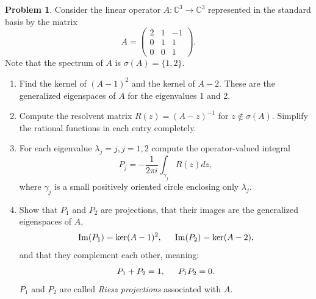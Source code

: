 \documentclass[12pt]{article}
\theoremstyle{definition}
\newtheorem{ex}{Problem}
\begin{document}
\begin{ex}
	Consider the linear operator $A : \mathbb{C}^3 \to \mathbb{C}^3$ represented in the standard basis by the matrix \begin{equation*}
		A = \begin{pmatrix}2 & 1 & -1 \\ 0 & 1 & 1 \\ 0 & 0 & 1\end{pmatrix}.
	\end{equation*}
	Note that the spectrum of $A$ is $\sigma(A) = \lbrace 1, 2 \rbrace$.
	\begin{enumerate}[label=(\alph*)]
		\item Find the kernel of $(A-1)^2$ and the kernel of $A-2$.
		      These are the generalized eigenspaces of $A$ for the eigenvalues 1 and 2.
		\item Compute the resolvent matrix $R(z) = (A-z)^{-1}$ for $z \not\in \sigma(A)$.
		      Simplify the rational functions in each entry completely.
		\item For each eigenvalue $\lambda_j = j, j = 1,2$ compute the operator-valued integral \begin{equation*}
			      P_j = -\frac{1}{2\pi i} \int_{\gamma_j} R(z) dz,
		      \end{equation*}
		      where $\gamma_j$ is a small positively oriented circle enclosing only $\lambda_j$.
		\item Show that $P_1$ and $P_2$ are projections, that their images are the generalized eigenspaces of $A$, \begin{equation*}
			      \mathrm{Im}(P_1) = \ker(A-1)^2, \hspace{1.5em} \mathrm{Im}(P_2) = \ker(A-2),
		      \end{equation*}
		      and that they complement each other, meaning: \begin{equation*}
			      P_1 + P_2 = 1, \hspace{1.5em} P_1P_2 = 0.
		      \end{equation*}
		      $P_1$ and $P_2$ are called \textit{Riesz projections} associated with $A$.
	\end{enumerate}
\end{ex}
\end{document}
